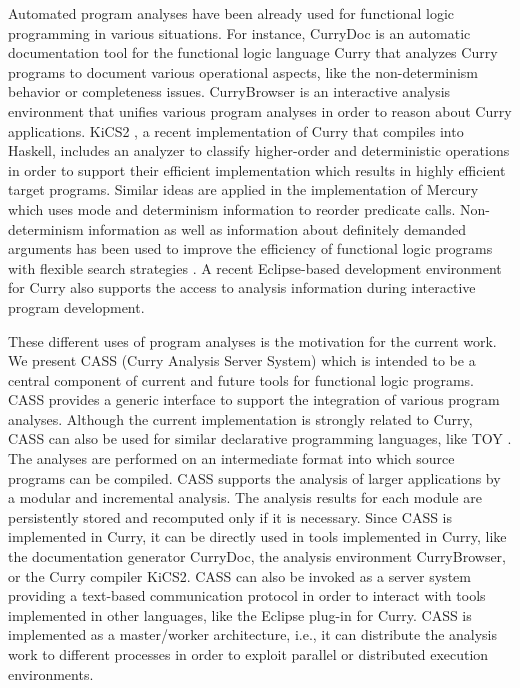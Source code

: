 \documentclass{llncs}
\begin{document}
Automated program analyses have been already used for functional logic
programming in various situations. For instance,
CurryDoc \cite{Hanus02WFLP} is an automatic documentation tool
for the functional logic language Curry
that analyzes Curry programs to document
various operational aspects, like the non-determinism behavior
or completeness issues.
CurryBrowser \cite{Hanus06WLPE} is an interactive analysis
environment that unifies various program analyses in order
to reason about Curry applications.
KiCS2 \cite{BrasselHanusPeemoellerReck11}, a recent
implementation of Curry that compiles into Haskell,
includes an analyzer to classify higher-order and
deterministic operations in order to support their efficient
implementation which results in highly efficient target programs.
Similar ideas are applied in the implementation
of Mercury \cite{SomogyiHendersonConway96} which uses
mode and determinism information to reorder predicate calls.
Non-determinism information as well as information
about definitely demanded arguments has been used to
improve the efficiency of functional logic programs
with flexible search strategies \cite{Hanus12ICLP}.
A recent Eclipse-based development environment for Curry
\cite{Palkus12} also supports the access to analysis information
during interactive program development.

These different uses of program analyses is the motivation
for the current work.
We present CASS (Curry Analysis Server System)
which is intended to be a central component of
current and future tools for functional logic programs.
CASS provides a generic interface to support the integration
of various program analyses.
Although the current implementation is strongly related to Curry,
CASS can also be used for similar declarative programming languages,
like TOY \cite{Lopez-FraguasSanchez-Hernandez99}.
The analyses are performed on an intermediate format into which 
source programs can be compiled.
CASS supports the analysis of larger applications
by a modular and incremental analysis. 
The analysis results for each module are persistently stored and
recomputed only if it is necessary.
Since CASS is implemented in Curry, it can be directly used
in tools implemented in Curry, like the documentation generator
CurryDoc, the analysis environment CurryBrowser,
or the Curry compiler KiCS2.
CASS can also be invoked as a server system
providing a text-based communication protocol in order to
interact with tools implemented in other languages,
like the Eclipse plug-in for Curry.
CASS is implemented as a master/worker architecture,
i.e., it can distribute the analysis work to different processes
in order to exploit parallel or distributed execution environments.
\end{document}
